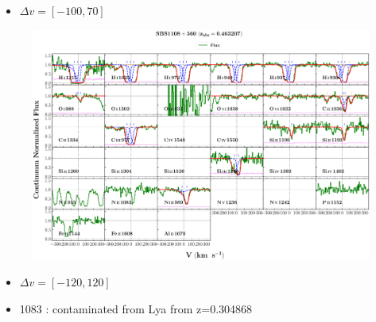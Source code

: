\documentclass[12pt]{report}
\newcommand\ion[2]{\text{#1\,\textsc{\lowercase{#2}}}}
\begin{document}
\begin{itemize}
    \item $\Delta v = [-100,70]$
\end{itemize}


\begin{landscape}

    \begin{figure}
        \centering
        \vspace{-20mm}
        \hspace*{-35mm}
        \includegraphics[width=1.25\linewidth]{sys_plots_full/SBS1108+560_z=0.463207_sys_plot_full.png}
    \end{figure}
    
\end{landscape}


\begin{itemize}
    \item $\Delta v = [-120,120]$
    \item \ion{N}{ii} 1083 : contaminated from Lya from z=0.304868
\end{itemize}
\end{document}
